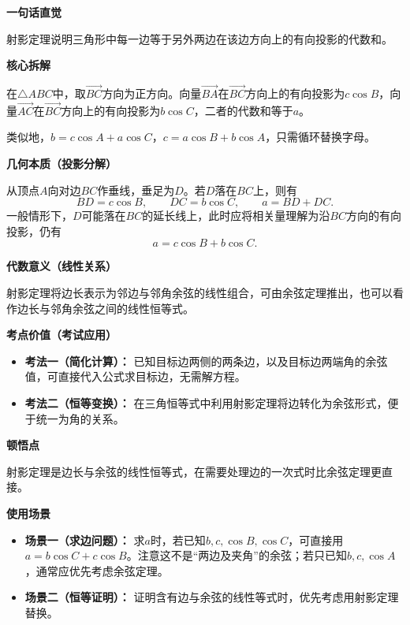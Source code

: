\begin{explanationbox}
	\textbf{\textcolor{CExplanation}{一句话直觉}}

	射影定理说明三角形中每一边等于另外两边在该边方向上的有向投影的代数和。

	\medskip
	\textbf{\textcolor{CExplanation}{核心拆解}}
	\begin{description}[style=nextline, leftmargin=2.8em, labelsep=0.5em, itemsep=0.45em]
		\item[\textbf{要点一（有向投影）：}] 在$\triangle ABC$中，取$\overrightarrow{BC}$方向为正方向。向量$\overrightarrow{BA}$在$\overrightarrow{BC}$方向上的有向投影为$c\cos B$，向量$\overrightarrow{AC}$在$\overrightarrow{BC}$方向上的有向投影为$b\cos C$，二者的代数和等于$a$。
		\item[\textbf{要点二（轮换对称）：}] 类似地，$b = c\cos A + a\cos C$，$c = a\cos B + b\cos A$，只需循环替换字母。
	\end{description}

	\medskip
	\textbf{\textcolor{CExplanation}{几何本质（投影分解）}}

	从顶点$A$向对边$BC$作垂线，垂足为$D$。若$D$落在$BC$上，则有
	\[
		BD=c\cos B,\qquad DC=b\cos C,\qquad a=BD+DC.
	\]
	一般情形下，$D$可能落在$BC$的延长线上，此时应将相关量理解为沿$BC$方向的有向投影，仍有
	\[
		a=c\cos B+b\cos C.
	\]

	\medskip
	\textbf{\textcolor{CExplanation}{代数意义（线性关系）}}

	射影定理将边长表示为邻边与邻角余弦的线性组合，可由余弦定理推出，也可以看作边长与邻角余弦之间的线性恒等式。

	\medskip
	\textbf{\textcolor{CExplanation}{考点价值（考试应用）}}
	\begin{itemize}[leftmargin=*, itemsep=0.5em, topsep=0.4em]
		\item \textbf{考法一（简化计算）：} 已知目标边两侧的两条边，以及目标边两端角的余弦值，可直接代入公式求目标边，无需解方程。
		\item \textbf{考法二（恒等变换）：} 在三角恒等式中利用射影定理将边转化为余弦形式，便于统一为角的关系。
	\end{itemize}

	\medskip
	\textbf{\textcolor{CExplanation}{顿悟点}}

	射影定理是边长与余弦的线性恒等式，在需要处理边的一次式时比余弦定理更直接。

	\medskip
	\textbf{\textcolor{CExplanation}{使用场景}}
	\begin{itemize}[leftmargin=*, itemsep=0.5em, topsep=0.4em]
		\item \textbf{场景一（求边问题）：} 求$a$时，若已知$b,c,\cos B,\cos C$，可直接用$a=b\cos C+c\cos B$。注意这不是“两边及夹角”的余弦；若只已知$b,c,\cos A$，通常应优先考虑余弦定理。
		\item \textbf{场景二（恒等证明）：} 证明含有边与余弦的线性等式时，优先考虑用射影定理替换。
	\end{itemize}
\end{explanationbox}